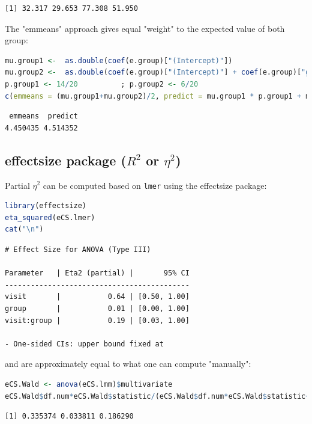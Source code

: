 \documentclass[12pt]{article}
\begin{document}
\label{}
\begin{verbatim}
[1] 32.317 29.653 77.308 51.950
\end{verbatim}


The "emmeans" approach gives equal "weight" to the expected value of
both group:
\begin{lstlisting}[language=r,numbers=none]
mu.group1 <-  as.double(coef(e.group)["(Intercept)"])
mu.group2 <-  as.double(coef(e.group)["(Intercept)"] + coef(e.group)["group2TRUE"])
p.group1 <- 14/20          ; p.group2 <- 6/20
c(emmeans = (mu.group1+mu.group2)/2, predict = mu.group1 * p.group1 + mu.group2 * p.group2)
\end{lstlisting}

\label{}
\begin{verbatim}
 emmeans  predict 
4.450435 4.514352
\end{verbatim}


\clearpage
\subsection{effectsize package (\(R^2\) or \(\eta^2\))}
\label{sec:orgae98b44}

Partial \(\eta^2\) can be computed based on \texttt{lmer} using the effectsize package:
\begin{lstlisting}[language=r,numbers=none]
library(effectsize)
eta_squared(eCS.lmer)
cat("\n")
\end{lstlisting}

\label{}
\begin{verbatim}
# Effect Size for ANOVA (Type III)

Parameter   | Eta2 (partial) |       95% CI
-------------------------------------------
visit       |           0.64 | [0.50, 1.00]
group       |           0.01 | [0.00, 1.00]
visit:group |           0.19 | [0.03, 1.00]

- One-sided CIs: upper bound fixed at
\end{verbatim}


and are approximately equal to what one can compute "manually":
\begin{lstlisting}[language=r,numbers=none]
eCS.Wald <- anova(eCS.lmm)$multivariate
eCS.Wald$df.num*eCS.Wald$statistic/(eCS.Wald$df.num*eCS.Wald$statistic+eCS.Wald$df.denom)
\end{lstlisting}

\label{}
\begin{verbatim}
[1] 0.335374 0.033811 0.186290
\end{verbatim}
\end{document}
